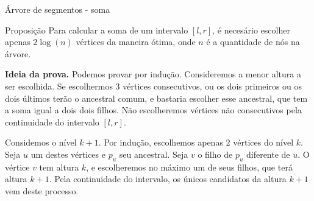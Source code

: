 \begin{frame}{Árvore de segmentos - soma}

    \begin{block}{Proposição}
        Para calcular a soma de um intervalo $[l, r]$, é necesário escolher apenas $2 \log(n)$ vértices da maneira ótima, onde $n$ é a quantidade de nós na árvore.
    \end{block}
    {\bf Ideia da prova.} Podemos provar por indução. Consideremos a menor altura a ser escolhida. Se escolhermos $3$ vértices consecutivos, ou os dois primeiros ou os dois últimos terão o ancestral comum, e bastaria escolher esse ancestral, que tem a soma igual a dois dois filhos. Não escolheremos vértices não consecutivos pela continuidade do intervalo $[l, r]$.

    Considemos o nível $k+1$. Por indução, escolhemos apenas $2$ vértices do nível $k$. Seja $u$ um destes vértices e $p_u$ seu ancestral. Seja $v$ o filho de $p_u$ diferente de $u$. O vértice $v$ tem altura $k$, e escolheremos no máximo um de seus filhos, que terá altura $k+1$. Pela continuidade do intervalo, os únicos candidatos da altura $k+1$ vem deste processo.


    
    





\end{frame}
